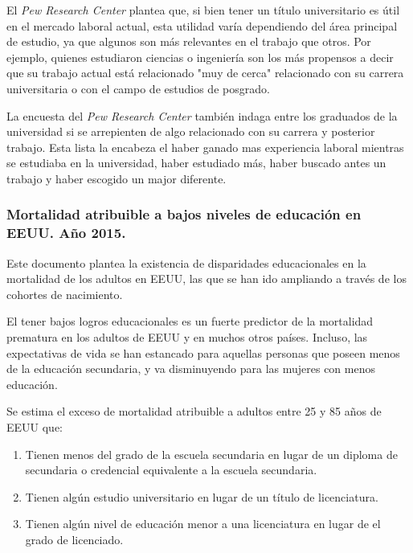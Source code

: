 El \textit{Pew Research Center} plantea que, si bien tener un título universitario es útil en el mercado laboral actual, esta utilidad varía dependiendo del área principal de estudio, ya que algunos son más relevantes en el trabajo que otros. Por ejemplo, quienes estudiaron ciencias o ingeniería son los más propensos a decir que su trabajo actual está relacionado  "muy de cerca" relacionado con su carrera universitaria o con el campo de estudios de posgrado.

La encuesta del \textit{Pew Research Center} también indaga entre los graduados de la universidad si se arrepienten de algo relacionado con su carrera y posterior trabajo. Esta lista la encabeza el haber ganado mas experiencia laboral mientras se estudiaba en la universidad, haber estudiado más, haber buscado antes un trabajo y haber escogido un major diferente. 


\subsubsection{Mortalidad atribuible a bajos niveles de educación en EEUU. Año 2015.}
Este documento plantea la existencia de disparidades educacionales en la mortalidad de los adultos en EEUU, las que se han ido ampliando a través de los cohortes de nacimiento. 

El tener bajos logros educacionales es un fuerte predictor de la mortalidad prematura en los adultos de EEUU y en muchos otros países. Incluso, las expectativas de vida se han estancado para aquellas personas que poseen menos de la educación secundaria, y va disminuyendo para las mujeres con menos educación. 

Se estima el exceso de mortalidad atribuible a adultos entre 25 y 85 años de EEUU que:
\begin{enumerate}
\item Tienen menos del grado de la escuela secundaria en lugar de un diploma de secundaria o credencial equivalente a la escuela secundaria.
\item Tienen algún estudio universitario en lugar de un título de licenciatura.
\item Tienen algún nivel de educación menor a una licenciatura en lugar de el grado de licenciado.
\end{enumerate}

